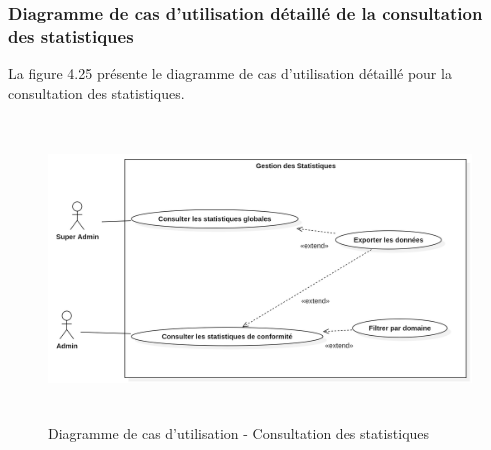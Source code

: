 \subsubsection{Diagramme de cas d'utilisation détaillé de la consultation des statistiques}
\noindent La figure 4.25 présente le diagramme de cas d'utilisation détaillé pour la consultation des statistiques.

\begin{figure}[H] 
    \centering
    \includegraphics[width=12cm,height=8cm]{images/statisticsuc.png}
    \caption{Diagramme de cas d'utilisation - Consultation des statistiques}
\end{figure}


